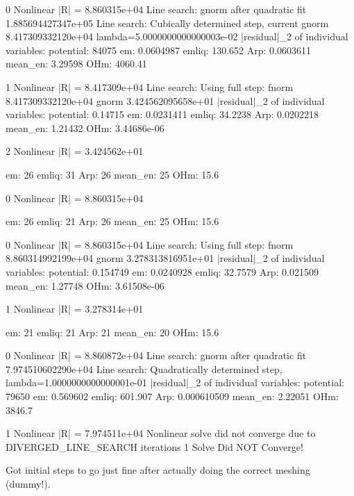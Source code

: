 {0 Nonlinear |R| = 8.860315e+04
      Line search: gnorm after quadratic fit 1.885694427347e+05
      Line search: Cubically determined step, current gnorm 8.417309332120e+04 lambda=5.0000000000000003e-02
    |residual|_2 of individual variables:
                  potential: 84075
                  em:        0.0604987
                  emliq:     130.652
                  Arp:       0.0603611
                  mean_en:   3.29598
                  OHm:       4060.41

 1 Nonlinear |R| = 8.417309e+04
      Line search: Using full step: fnorm 8.417309332120e+04 gnorm 3.424562095658e+01
    |residual|_2 of individual variables:
                  potential: 0.14715
                  em:        0.0231411
                  emliq:     34.2238
                  Arp:       0.0202218
                  mean_en:   1.21432
                  OHm:       3.44686e-06

 2 Nonlinear |R| = 3.424562e+01

em: 26
emliq: 31
Arp: 26
mean_en: 25
OHm: 15.6

 0 Nonlinear |R| = 8.860315e+04

em: 26
emliq: 21
Arp: 26
mean_en: 25
OHm: 15.6


0 Nonlinear |R| = 8.860315e+04
      Line search: Using full step: fnorm 8.860314992199e+04 gnorm 3.278313816951e+01
    |residual|_2 of individual variables:
                  potential: 0.154749
                  em:        0.0240928
                  emliq:     32.7579
                  Arp:       0.021509
                  mean_en:   1.27748
                  OHm:       3.61508e-06

 1 Nonlinear |R| = 3.278314e+01

em: 21
emliq: 21
Arp: 21
mean_en: 20
OHm: 15.6

 0 Nonlinear |R| = 8.860872e+04
      Line search: gnorm after quadratic fit 7.974510602290e+04
      Line search: Quadratically determined step, lambda=1.0000000000000001e-01
    |residual|_2 of individual variables:
                  potential: 79650
                  em:        0.569602
                  emliq:     601.907
                  Arp:       0.000610509
                  mean_en:   2.22051
                  OHm:       3846.7

 1 Nonlinear |R| = 7.974511e+04
Nonlinear solve did not converge due to DIVERGED_LINE_SEARCH iterations 1
 Solve Did NOT Converge!


Got initial steps to go just fine after actually doing the correct meshing (dummy!).

}
